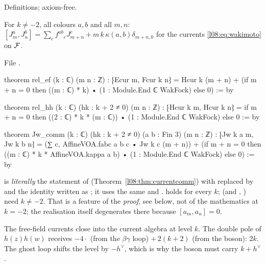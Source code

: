 \begin{status}
Definitions; axiom-free.
\end{status}

\begin{theorem}\label{l08:thm:Jwcomm}
For $k\ne-2$, all colours $a,b$ and all $m,n$:
$[J^a_m,J^b_n] = \sum_cf^{ab}{}_cJ^c_{m+n} + m\,k\,\kappa(a,b)\delta_{m+n,0}$ for the currents
\eqref{l08:eq:wakimoto} on $\mathcal{F}$.
\end{theorem}

\noindent File .
\begin{leancode}
theorem rel_ef (k : ℂ) (m n : ℤ) :
    ⁅Ecur m, Fcur k n⁆
      = Hcur k (m + n)
        + (if m + n = 0 then ((m : ℂ) * k) • (1 : Module.End ℂ WakFock) else 0) := by

theorem rel_hh (k : ℂ) (hk : k + 2 ≠ 0) (m n : ℤ) :
    ⁅Hcur k m, Hcur k n⁆
      = if m + n = 0 then ((2 : ℂ) * k * (m : ℂ)) • (1 : Module.End ℂ WakFock) else 0 := by

theorem Jw_comm (k : ℂ) (hk : k + 2 ≠ 0) (a b : Fin 3) (m n : ℤ) :
    ⁅Jw k a m, Jw k b n⁆
      = (∑ c, AffineVOA.fabc a b c • Jw k c (m + n))
        + (if m + n = 0 then ((m : ℂ) * k * AffineVOA.kappa a b) •
            (1 : Module.End ℂ WakFock) else 0) := by
\end{leancode}

\begin{dictionary}
 is \emph{literally} the statement of 
(Theorem~\ref{l08:thm:currentcomm}) with  replaced by  and the identity written as
; it uses the same  and .  holds for every $k$; 
(and , ) need $k\ne-2$. That is a feature of the \emph{proof}, see below,
not of the mathematics at $k=-2$; the realisation itself degenerates there because $[a_m,a_n]=0$.
\end{dictionary}

\begin{physics}
The free-field currents close into the current algebra at level $k$. The double pole of $h(z)h(w)$
receives $-4\cdot\!$ (from the $\beta\gamma$ loop) $+\,2(k+2)$ (from the boson): $2k$. The ghost loop
shifts the level by $-h^\vee$, which is why the boson must carry $k+h^\vee$.
\end{physics}

